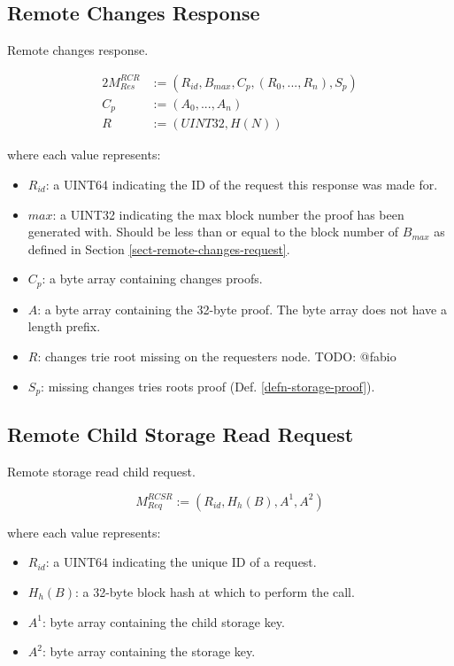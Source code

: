 \documentclass{book}
\newcommand{\todo}[1]{}
\renewcommand{\todo}[1]{{\color{red} TODO: {#1}}}
\begin{document}
\subsection{Remote Changes Response}

Remote changes response.

\begin{alignat*}{2}
    M^{RCR}_{Res} &:= (R_{id}, B_{max}, C_p, (R_0, ..., R_n), S_p) \\
    C_p &:= (A_0, ...,A_n) \\
    R &:= (UINT32, H(N))
\end{alignat*}

where each value represents:

\begin{itemize}
    \item $R_{id}$: a UINT64 indicating the ID of the request this response was
    made for.
    \item $max$: a UINT32 indicating the max block number the proof has been
    generated with. Should be less than or equal to the block number of
    $B_{max}$ as defined in Section \ref{sect-remote-changes-request}.
    \item $C_p$: a byte array containing changes proofs.
    \item $A$: a byte array containing the 32-byte proof. The byte array does
    not have a length prefix.
    \item $R$: changes trie root missing on the requesters node. \todo{@fabio}
    \item $S_p$: missing changes tries roots proof (Def.
    \ref{defn-storage-proof}).
\end{itemize}

\subsection{Remote Child Storage Read Request}

Remote storage read child request.

\[
    M^{RCSR}_{Req} := (R_{id}, H_h(B), A^1, A^2)
\]

where each value represents:

\begin{itemize}
    \item $R_{id}$: a UINT64 indicating the unique ID of a request.
    \item $H_h(B)$: a 32-byte block hash at which to perform the call.
    \item $A^1$: byte array containing the child storage key.
    \item $A^2$: byte array containing the storage key.
\end{itemize}
\end{document}

